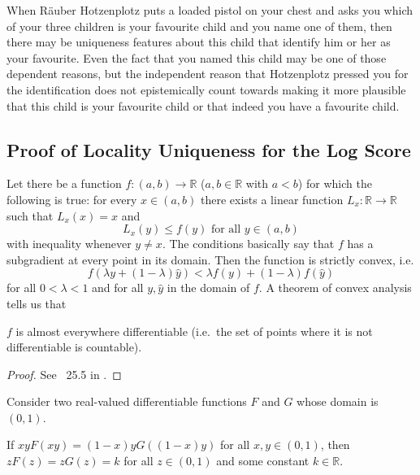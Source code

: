 \documentclass[12pt]{article}
\begin{document}
When R{\"a}uber Hotzenplotz puts a loaded pistol on your chest and
asks you which of your three children is your favourite child and you
name one of them, then there may be uniqueness features about this
child that identify him or her as your favourite. Even the fact that
you named this child may be one of those dependent reasons, but the
independent reason that Hotzenplotz pressed you for the identification
does not epistemically count towards making it more plausible that
this child is your favourite child or that indeed you have a favourite
child.

\subsection{Proof of Locality Uniqueness for the Log Score}
\label{subsec:kaixitun}

Let there be a function $f:(a,b)\rightarrow\mathbb{R}$
($a,b\in\mathbb{R}$ with $a<b$) for which the following is true: for
every $x\in(a,b)$ there exists a linear function
$L_{x}:\mathbb{R}\rightarrow\mathbb{R}$ such that $L_{x}(x)=x$ and
\begin{equation}
  \label{eq:jeedushe}
  L_{x}(y)\leq{}f(y)\mbox{ for all }y\in(a,b)
\end{equation}
with inequality whenever $y\neq{}x$. The conditions basically say that
$f$ has a subgradient at every point in its domain. Then the function
is strictly convex, i.e.
\begin{equation}
  \label{eq:poawaimo}
  f(\lambda{}y+(1-\lambda)\hat{y})<\lambda{}f(y)+(1-\lambda)f(\hat{y})
\end{equation}
for all $0<\lambda<1$ and for all $y,\hat{y}$ in the domain of $f$. A
theorem of convex analysis tells us that
\begin{lemma}
  \label{lma:ahvaiyoh}
  $f$ is almost everywhere differentiable (i.e.\ the set of points
  where it is not differentiable is countable).
\end{lemma}

\begin{proof}
  \label{prf:aiphahch}
  See {\heorem}~25.5 in .
\end{proof}

Consider two real-valued differentiable functions $F$ and $G$ whose
domain is $(0,1)$.
\begin{lemma}
  \label{lma:ohcoungo}
  If $xyF(xy)=(1-x)yG((1-x)y)$ for all $x,y\in(0,1)$, then
  $zF(z)=zG(z)=k$ for all $z\in(0,1)$ and some constant
  $k\in\mathbb{R}$. 
\end{lemma}
\end{document}
